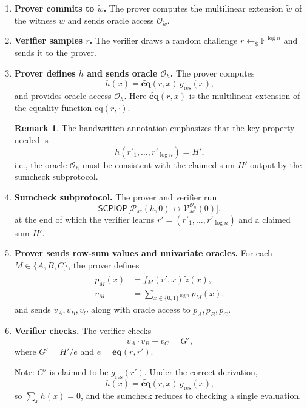 \documentclass[11pt]{article}
\theoremstyle{plain}
\theoremstyle{definition}
\newtheorem{remark}[theorem]{Remark}
\newcommand{\F}{\mathbb{F}}
\newcommand{\tildew}{\tilde{w}}
\newcommand{\tildeq}{\tilde{\mathbf{eq}}}
\newcommand{\tildez}{\tilde{z}}
\begin{document}
\begin{enumerate}
  \item \textbf{Prover commits to $\tildew$.}  The prover computes the multilinear extension
    $\tildew$ of the witness $w$ and sends oracle access $\mathcal{O}_{\tildew}$.

  \item \textbf{Verifier samples $r$.}  The verifier draws a random challenge
    $r \leftarrow_\$ \F^{\log n}$ and sends it to the prover.

  \item \textbf{Prover defines $h$ and sends oracle $\mathcal{O}_h$.}  The prover computes
    \[
      h(x) = \tildeq(r, x)\, g_{\mathrm{res}}(x),
    \]
    and provides oracle access $\mathcal{O}_h$.  Here $\tildeq(r,x)$ is the multilinear
    extension of the equality function $\mathrm{eq}(r,\cdot)$.

    \begin{remark}
      The handwritten annotation emphasizes that the key property needed is
      \[
        h(r'_1, \ldots, r'_{\log n}) = H',
      \]
      i.e., the oracle $\mathcal{O}_h$ must be consistent with the claimed sum $H'$
      output by the sumcheck subprotocol.
    \end{remark}

  \item \textbf{Sumcheck subprotocol.}  The prover and verifier run
    \[
      \mathsf{SCPIOP}\bigl[\mathcal{P}_{sc}(h,0) \leftrightarrow
      \mathcal{V}_{sc}^{\mathcal{O}_h}(0)\bigr],
    \]
    at the end of which the verifier learns
    $r' = (r'_1, \ldots, r'_{\log n})$ and a claimed sum $H'$.

  \item \textbf{Prover sends row-sum values and univariate oracles.}  For each
    $M \in \{A, B, C\}$, the prover defines
    \begin{align*}
      p_M(x) &= \tilde{f}_M(r', x)\,\tildez(x), \\
      v_M    &= \sum_{x \in \{0,1\}^{\log n}} p_M(x),
    \end{align*}
    and sends $v_A, v_B, v_C$ along with oracle access to $p_A, p_B, p_C$.

  \item \textbf{Verifier checks.}  The verifier checks
    \[
      v_A \cdot v_B - v_C = G',
    \]
    where $G' = H' / e$ and $e = \tildeq(r, r')$.

    Note: $G'$ is claimed to be $g_{\mathrm{res}}(r')$.  Under the correct derivation,
    \[
      h(x) = \tildeq(r, x)\, g_{\mathrm{res}}(x),
    \]
    so $\sum_x h(x) = 0$, and the sumcheck reduces to checking a single evaluation.
\end{enumerate}
\end{document}
